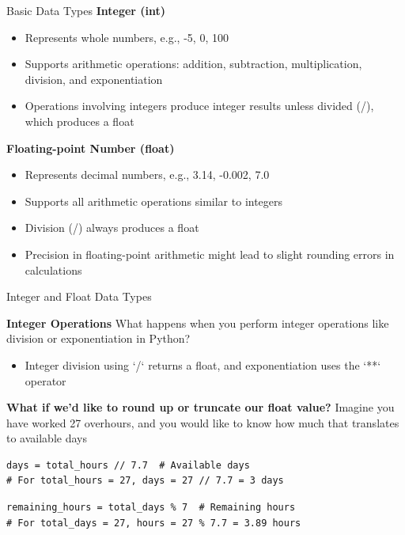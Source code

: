 \documentclass[
	11pt, 
]{beamer}
\begin{document}

\begin{frame}{Basic Data Types}
\textbf{Integer (int)}

    \begin{itemize}
            \item Represents whole numbers, e.g., -5, 0, 100
            \item Supports arithmetic operations: addition, subtraction, multiplication, division, and exponentiation
            \item Operations involving integers produce integer results unless divided (/), which produces a float
    \end{itemize} \bigskip

\textbf{Floating-point Number (float)}

    \begin{itemize}
            \item Represents decimal numbers, e.g., 3.14, -0.002, 7.0
            \item Supports all arithmetic operations similar to integers
            \item Division (/) always produces a float
            \item Precision in floating-point arithmetic might lead to slight rounding errors in calculations
    \end{itemize}
    
\end{frame}

\begin{frame}[fragile]{Integer and Float Data Types}


\begin{block}{\textbf{Integer Operations}}
What happens when you perform integer operations like division or exponentiation in Python?
\end{block}

\pause
\begin{itemize}
    \item Integer division using `/` returns a float, and exponentiation uses the `**` operator
\end{itemize}
\pause

\begin{block}{\textbf{What if we'd like to round up or truncate our float value?}}
Imagine you have worked 27 overhours, and you would like to know how much that translates to available days
\end{block}
\pause



\begin{verbatim}
days = total_hours // 7.7  # Available days
# For total_hours = 27, days = 27 // 7.7 = 3 days
\end{verbatim}
\begin{verbatim}
remaining_hours = total_days % 7  # Remaining hours
# For total_days = 27, hours = 27 % 7.7 = 3.89 hours
\end{verbatim}

\end{frame}
\end{document}
